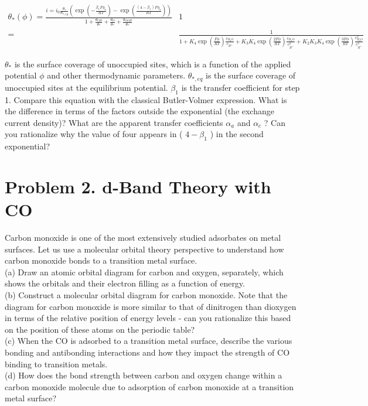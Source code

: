 \documentclass[12pt]{article}
\begin{document}
$$
\begin{aligned}
\theta_{*}(\phi)=\frac{i=i_{0} \frac{\theta_{*}}{\theta_{*, e q}}\left(\exp \left(-\frac{\beta_{1} F \eta_{s}}{R T}\right)-\exp \left(\frac{\left(4-\beta_{1}\right) F \eta_{s}}{R T}\right)\right)}{1+\frac{\theta_{O H}}{\theta_{*}}+\frac{\theta_{O}}{\theta_{*}}+\frac{\theta_{O O H}}{\theta_{*}}} & 1 \\
= & \frac{1}{1+K_{4} \exp \left(\frac{F \phi}{R T}\right) \frac{c_{H_{2} O}}{c_{H^{+}}}+K_{3} K_{4} \exp \left(\frac{2 F \phi}{R T}\right) \frac{c_{H_{2} O}}{c_{H^{+}}^{2}}+K_{2} K_{3} K_{4} \exp \left(\frac{3 F \phi}{R T}\right) \frac{c_{H_{2} O}^{2}}{c_{H^{+}}^{3}}}
\end{aligned}
$$

$\theta_{*}$ is the surface coverage of unoccupied sites, which is a function of the applied potential $\phi$ and other thermodynamic parameters. $\theta_{*, e q}$ is the surface coverage of unoccupied sites at the equilibrium potential. $\beta_{1}$ is the transfer coefficient for step 1. Compare this equation with the classical Butler-Volmer expression. What is the difference in terms of the factors outside the exponential (the exchange current density)? What are the apparent transfer coefficients $\alpha_{a}$ and $\alpha_{c}$ ? Can you rationalize why the value of four appears in ( $4-\beta_{1}$ ) in the second exponential?

\section*{Problem 2. d-Band Theory with CO}
Carbon monoxide is one of the most extensively studied adsorbates on metal surfaces. Let us use a molecular orbital theory perspective to understand how carbon monoxide bonds to a transition metal surface.\\
(a) Draw an atomic orbital diagram for carbon and oxygen, separately, which shows the orbitals and their electron filling as a function of energy.\\
(b) Construct a molecular orbital diagram for carbon monoxide. Note that the diagram for carbon monoxide is more similar to that of dinitrogen than dioxygen in terms of the relative position of energy levels - can you rationalize this based on the position of these atoms on the periodic table?\\
(c) When the CO is adsorbed to a transition metal surface, describe the various bonding and antibonding interactions and how they impact the strength of CO binding to transition metals.\\
(d) How does the bond strength between carbon and oxygen change within a carbon monoxide molecule due to adsorption of carbon monoxide at a transition metal surface?
\end{document}
